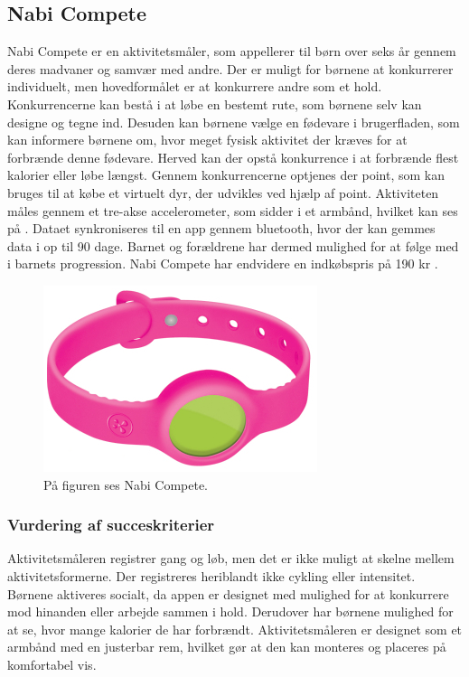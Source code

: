 \subsection{Nabi Compete}
Nabi Compete er en aktivitetsmåler, som appellerer til børn over seks år gennem deres madvaner og samvær med andre. Der er muligt for børnene at konkurrerer individuelt, men hovedformålet er at konkurrere andre som et hold. Konkurrencerne kan bestå i at løbe en bestemt rute, som børnene selv kan designe og tegne ind. Desuden kan børnene vælge en fødevare i brugerfladen, som kan informere børnene om, hvor meget fysisk aktivitet der kræves for at forbrænde denne fødevare. Herved kan der opstå konkurrence i at forbrænde flest kalorier eller løbe længst. %
 Gennem konkurrencerne optjenes der point, som kan bruges til at købe et virtuelt dyr, der udvikles ved hjælp af point. 
Aktiviteten måles gennem et tre-akse accelerometer, som sidder i et armbånd, hvilket kan ses på . Dataet synkroniseres til en app gennem bluetooth, hvor der kan gemmes data i op til 90 dage. Barnet og forældrene har dermed mulighed for at følge med i barnets progression. 
Nabi Compete har endvidere en indkøbspris på 190 kr \citep{Fuhu2015,Fuhu_tech2015}. 

\begin{figure}[H]
	\centering
	\includegraphics[scale=0.8]{figures/aProblemanalyse/nabi.png}
	\caption{På figuren ses Nabi Compete. \citep{Perez2015}}
	\label{fig:nabi}
\end{figure}

\subsubsection{Vurdering af succeskriterier}
Aktivitetsmåleren registrer gang og løb, men det er ikke muligt at skelne mellem aktivitetsformerne. Der registreres heriblandt ikke cykling eller intensitet. Børnene aktiveres socialt, da appen er designet med mulighed for at konkurrere mod hinanden eller arbejde sammen i hold. Derudover har børnene mulighed for %
at se, hvor mange kalorier de har forbrændt. Aktivitetsmåleren er designet som et armbånd med en justerbar rem, hvilket gør at den kan monteres og placeres på komfortabel vis.~\citep{Fuhu2015,Fuhu_tech2015}

